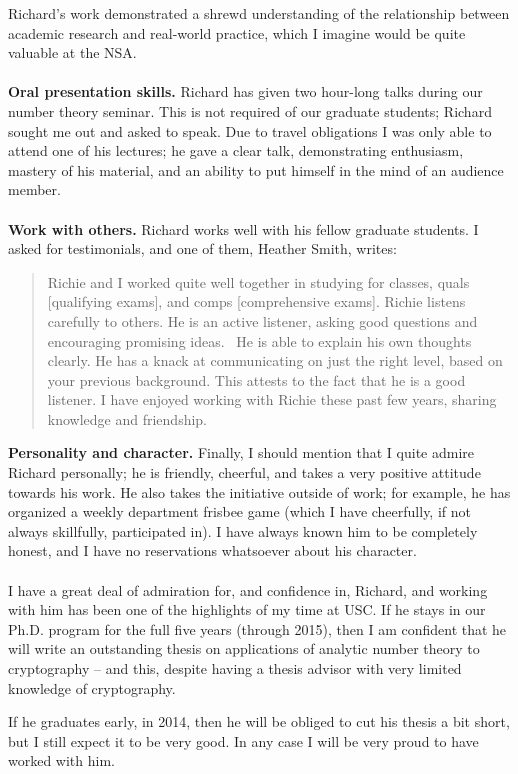 \documentclass[11pt]{article}
\begin{document}
Richard's work demonstrated a shrewd understanding of
the relationship between academic
research and real-world practice, which I imagine would be quite valuable at the NSA.
\\
\\
{\bf Oral presentation skills.} Richard has given two hour-long talks during our number theory seminar.
This is not required of our graduate students; Richard sought me out and asked to speak. Due to travel
obligations I was only able to attend one of his lectures; he gave a clear talk, demonstrating enthusiasm, mastery of his material, and an ability to put himself in the mind of an audience member.
\\
\\
{\bf Work with others.} Richard works well with his fellow graduate students. I asked for testimonials, and
one of them, Heather Smith, writes:
\begin{quote}
Richie and I worked quite well together in studying for classes, quals [qualifying exams], and comps [comprehensive exams]. Richie listens carefully to others.
He is an active listener, asking good questions and encouraging promising ideas.  He is able to explain his own
thoughts clearly. He has a knack at communicating on just the right level, based on your previous background. This
attests to the fact that he is a good listener. I have enjoyed working with Richie these past few years, sharing
knowledge and friendship. 
\end{quote}
{\bf Personality and character.} 
Finally, I should mention that I quite admire Richard personally; he is friendly, cheerful, and takes a
very positive attitude towards his work. He also takes the initiative outside of work; for example,
he has organized
a weekly department frisbee game (which I have cheerfully, if not always skillfully, participated in). 
I have always
known him to be completely honest, and 
I have no reservations whatsoever about his character.
\\
\\
I have a great deal of admiration for, and confidence in, Richard, and working with him has been one of
the highlights of my time at USC. If he stays in our Ph.D. program for the full five years (through 2015),
then I am confident that he will write an outstanding thesis on 
applications of analytic number theory to
cryptography -- and this, despite having a thesis advisor with very limited knowledge of cryptography.

If he graduates early, in 2014, then he will be obliged to cut his thesis a bit short, but I still 
expect it to be very good. In any case
I will be very proud to have worked with him.
\end{document}
